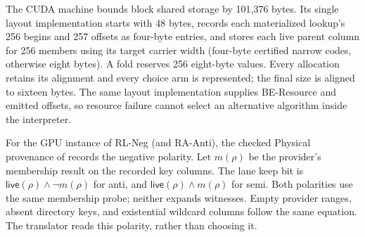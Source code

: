 The CUDA machine bounds block shared storage by 101,376 bytes. Its single
layout implementation starts with 48 bytes, records each materialized lookup's
256 begins and 257 offsets as four-byte entries, and stores each live parent
column for 256 members using its target carrier width (four-byte certified
narrow codes, otherwise eight bytes). A fold reserves 256 eight-byte values.
Every allocation retains its alignment and every choice arm is represented;
the final size is aligned to sixteen bytes. The same layout implementation
supplies BE-Resource and emitted offsets, so resource failure cannot select
an alternative algorithm inside the interpreter.

For the GPU instance of RL-Neg (and RA-Anti), the checked Physical provenance
of  records the negative polarity. Let
$m(\rho)$ be the provider's membership result on the recorded key columns.
The lane keep bit is $\mathsf{live}(\rho)\land\neg m(\rho)$ for anti,
and $\mathsf{live}(\rho)\land m(\rho)$ for semi. Both polarities use the
same membership probe; neither expands witnesses. Empty provider ranges,
absent directory keys, and existential wildcard columns follow the same
equation. The translator reads this polarity, rather than choosing it.

